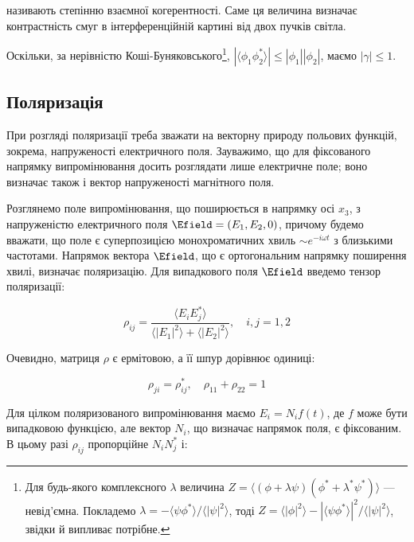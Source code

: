 називають степінню взаємної когерентності. Саме ця величина визначає контрастність смуг в інтерференційній картині від двох пучків світла.

Оскільки, за нерівністю Коші-Буняковського\footnote{Для будь-якого комплексного \(\lambda\) величина \(Z = \langle (\phi + \lambda \psi)(\phi^{*} +
\lambda^{*} \psi^{*}) \rangle\) --- невід’ємна. Покладемо \(\lambda = -\langle \psi \phi^{*} \rangle / \langle |\psi|^2 \rangle\), тоді \(Z = \langle
|\phi|^2 \rangle - |\langle \psi \phi^{*} \rangle|^2 / \langle |\psi|^2 \rangle\), звідки й випливає потрібне.}, \(|\langle \phi_1 \phi_2^{*} \rangle|
\leq |\phi_1||\phi_2|\), маємо \(|\gamma| \leq 1\).

\subsection*{Поляризація}

При розгляді поляризації треба зважати на векторну природу польових функцій, зокрема, напруженості електричного поля. Зауважимо, що для фіксованого
напрямку випромінювання досить розглядати лише електричне поле; воно визначає також і вектор напруженості магнітного поля.

Розглянемо поле випромінювання, що поширюється в напрямку осі \(x_3\), з напруженістю електричного поля \(\Efield = (E_1, E_2, 0)\), причому будемо
вважати, що поле є суперпозицією монохроматичних хвиль \(\sim e^{-i\omega t}\) з близькими частотами. Напрямок вектора \(\Efield\), що є ортогональним
напрямку поширення хвилі, визначає поляризацію. Для випадкового поля \(\Efield\) введемо тензор поляризації:

\begin{equation}
\rho_{ij} = \frac{\langle E_i E_j^{*} \rangle}{\langle |E_1|^2 \rangle + \langle |E_2|^2 \rangle}, \quad i, j = 1, 2
\label{eq:polarization_tensor}
\end{equation}

Очевидно, матриця \(\rho\) є ермітовою, а її шпур дорівнює одиниці:

\begin{equation*}
\rho_{ji} = \rho_{ij}^{*}, \quad \rho_{11} + \rho_{22} = 1
\end{equation*}

Для цілком поляризованого випромінювання маємо \(E_i = N_i f(t)\), де \(f\) може бути випадковою функцією, але вектор \(N_i\), що визначає напрямок
поля, є фіксованим. В цьому разі \(\rho_{ij}\) пропорційне \(N_i N_j^{*}\) і:

